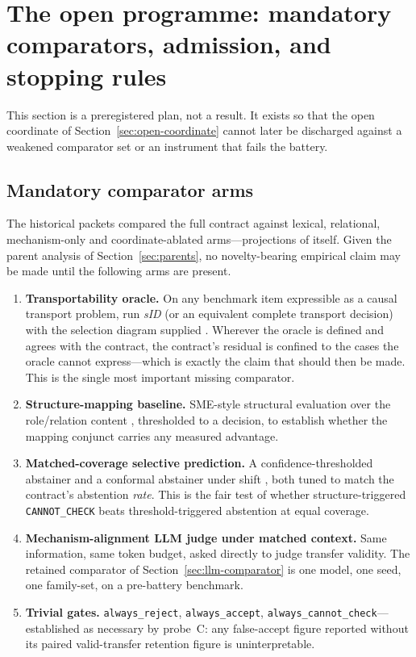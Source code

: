\section{The open programme: mandatory comparators, admission, and stopping rules}
\label{sec:open-programme}

This section is a preregistered plan, not a result. It exists so that the open coordinate of Section~\ref{sec:open-coordinate} cannot later be discharged against a weakened comparator set or an instrument that fails the battery.

\subsection{Mandatory comparator arms}

The historical packets compared the full contract against lexical, relational, mechanism-only and coordinate-ablated arms---projections of itself. Given the parent analysis of Section~\ref{sec:parents}, no novelty-bearing empirical claim may be made until the following arms are present.

\begin{enumerate}[leftmargin=*]
\item \textbf{Transportability oracle.} On any benchmark item expressible as a causal transport problem, run \textit{sID} (or an equivalent complete transport decision) with the selection diagram supplied \cite{bareinboim2012completeness,bareinboim2013general}. Wherever the oracle is defined and agrees with the contract, the contract's residual is confined to the cases the oracle cannot express---which is exactly the claim that should then be made. This is the single most important missing comparator.
\item \textbf{Structure-mapping baseline.} SME-style structural evaluation over the role/relation content \cite{falkenhainer1989sme,forbus1995macfac}, thresholded to a decision, to establish whether the mapping conjunct carries any measured advantage.
\item \textbf{Matched-coverage selective prediction.} A confidence-thresholded abstainer and a conformal abstainer under shift \cite{geifman2017selective,wang2025conformal}, both tuned to match the contract's abstention \emph{rate}. This is the fair test of whether structure-triggered \texttt{CANNOT\_CHECK} beats threshold-triggered abstention at equal coverage.
\item \textbf{Mechanism-alignment LLM judge under matched context.} Same information, same token budget, asked directly to judge transfer validity. The retained comparator of Section~\ref{sec:llm-comparator} is one model, one seed, one family-set, on a pre-battery benchmark.
\item \textbf{Trivial gates.} \texttt{always\_reject}, \texttt{always\_accept}, \texttt{always\_cannot\_check}---established as necessary by probe~C: any false-accept figure reported without its paired valid-transfer retention figure is uninterpretable.
\end{enumerate}

